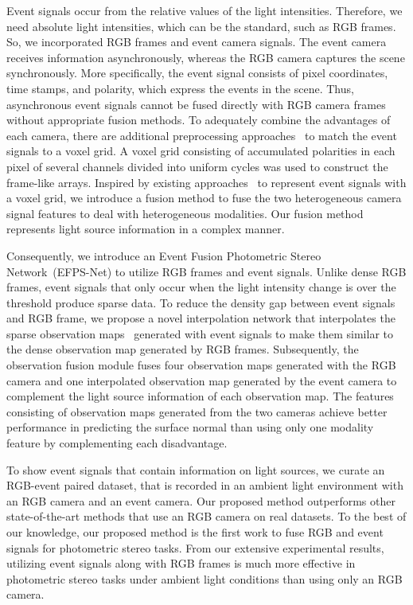 \documentclass[preprint,12pt,authoryear]{elsarticle}
\begin{document}
Event signals occur from the relative values of the light intensities. Therefore, we need absolute light intensities, which can be the standard, such as RGB frames. So, we incorporated RGB frames and event camera signals. The event camera receives information asynchronously, whereas the RGB camera captures the scene synchronously. More specifically, the event signal consists of pixel coordinates, time stamps, and polarity, which express the events in the scene. Thus, asynchronous event signals cannot be fused directly with RGB camera frames without appropriate fusion methods. To adequately combine the advantages of each camera, there are additional preprocessing approaches~\citep{rebecq2017real,innocenti2021temporal,gehrig2019end} to match the event signals to a voxel grid. A voxel grid consisting of accumulated polarities in each pixel of several channels divided into uniform cycles was used to construct the frame-like arrays. Inspired by existing approaches~\citep{rebecq2017real,innocenti2021temporal,gehrig2019end} to represent event signals with a voxel grid, we introduce a fusion method to fuse the two heterogeneous camera signal features to deal with heterogeneous modalities. Our fusion method represents light source information in a complex manner.

Consequently, we introduce an Event Fusion Photometric Stereo Network~(EFPS-Net) to utilize RGB frames and event signals. Unlike dense RGB frames, event signals that only occur when the light intensity change is over the threshold produce sparse data. To reduce the density gap between event signals and RGB frame, we propose a novel interpolation network that interpolates the sparse observation maps~\citep{ikehata2018cnn} generated with event signals to make them similar to the dense observation map generated by RGB frames. Subsequently, the observation fusion module fuses four observation maps generated with the RGB camera and one interpolated observation map generated by the event camera to complement the light source information of each observation map. The features consisting of observation maps generated from the two cameras achieve better performance in predicting the surface normal than using only one modality feature by complementing each disadvantage.

To show event signals that contain information on light sources, we curate an RGB-event paired dataset, that is recorded in an ambient light environment with an RGB camera and an event camera. Our proposed method outperforms other state-of-the-art methods that use an RGB camera on real datasets. To the best of our knowledge, our proposed method is the first work to fuse RGB and event signals for photometric stereo tasks. From our extensive experimental results, utilizing event signals along with RGB frames is much more effective in photometric stereo tasks under ambient light conditions than using only an RGB camera.
\end{document}

